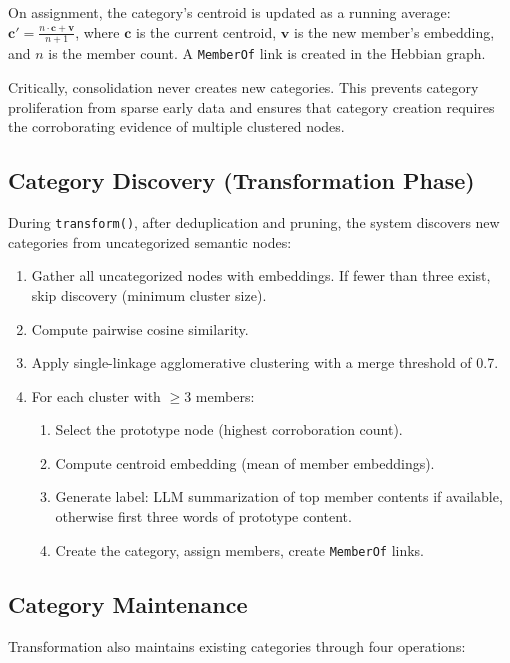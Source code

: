 On assignment, the category's centroid is updated as a running average:
$\mathbf{c}' = \frac{n \cdot \mathbf{c} + \mathbf{v}}{n + 1}$, where
$\mathbf{c}$ is the current centroid, $\mathbf{v}$ is the new member's
embedding, and $n$ is the member count. A \texttt{MemberOf} link is created
in the Hebbian graph.

Critically, consolidation never creates new categories. This prevents
category proliferation from sparse early data and ensures that category
creation requires the corroborating evidence of multiple clustered nodes.

\subsection{Category Discovery (Transformation Phase)}

During \texttt{transform()}, after deduplication and pruning, the system
discovers new categories from uncategorized semantic nodes:

\begin{enumerate}[nosep]
    \item Gather all uncategorized nodes with embeddings. If fewer than
    three exist, skip discovery (minimum cluster size).
    \item Compute pairwise cosine similarity.
    \item Apply single-linkage agglomerative clustering with a merge
    threshold of 0.7.
    \item For each cluster with $\geq$3 members:
    \begin{enumerate}[nosep]
        \item Select the prototype node (highest corroboration count).
        \item Compute centroid embedding (mean of member embeddings).
        \item Generate label: LLM summarization of top member contents if
        available, otherwise first three words of prototype content.
        \item Create the category, assign members, create \texttt{MemberOf}
        links.
    \end{enumerate}
\end{enumerate}

\subsection{Category Maintenance}

Transformation also maintains existing categories through four operations:

